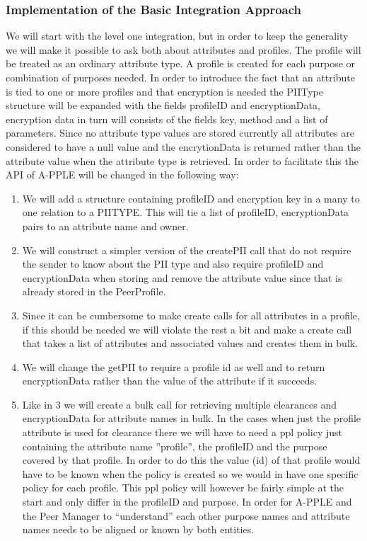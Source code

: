 \subsubsection{Implementation of the Basic Integration Approach}
We will start with the level one integration, but in order to keep the generality we will make it possible to ask both about attributes and profiles. The profile will be treated as an ordinary attribute type. A profile is created for each purpose or combination of purposes needed.
In order to introduce the fact that an attribute is tied to one or more profiles and that encryption is needed the PIIType structure will be expanded with the fields profileID and encryptionData, encryption data in turn will consists of the fields  key, method and a list of parameters. Since no attribute type values are stored currently all attributes are considered to have a null value and the encrytionData is returned rather than the attribute value when the attribute type is retrieved.
In order to facilitate this the API of A-PPLE will be changed in the following way:
\begin{enumerate}
	\item We will add a structure containing profileID and encryption key in a many to one  relation to a PIITYPE. This will tie a list of profileID, encryptionData pairs to an attribute name and owner.
	\item We will construct a simpler version of the createPII call that do not require the sender to know about the PII type and also require profileID and encryptionData when storing and remove the attribute value since that is already stored in the PeerProfile.
	\item Since it can be cumbersome to make create calls for all attributes in a profile, if this should be needed we will violate the rest a bit and make a create call that takes a list of attributes and associated values and creates them in bulk. 
	\item We will change the getPII to require a profile id as well and to return encryptionData rather than the value of the attribute if it succeeds.
	\item  Like in 3 we will create a bulk call for retrieving multiple clearances and encryptionData for attribute names in bulk.
In the cases when just the profile attribute is used for clearance there we will have to need a ppl policy just containing the attribute name ”profile”, the profileID and the purpose covered by that profile. In order to do this the value (id) of that profile would have to be known when the policy is created so we would in have one specific policy for each profile. This ppl policy will however be fairly simple at the start and only differ in the profileID and purpose.
In order for A-PPLE and the Peer Manager to “understand” each other purpose names and attribute names needs to be aligned or known by both entities. 
\end{enumerate}